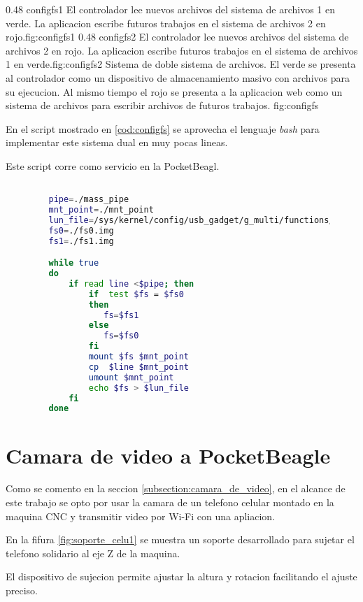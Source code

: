 \subfigab 
   {0.48} {configfs1} {El controlador lee nuevos archivos del sistema de archivos 1 en verde. La aplicacion escribe futuros trabajos en el sistema de archivos 2 en rojo.}{fig:configfs1}
   {0.48} {configfs2} {El controlador lee nuevos archivos del sistema de archivos 2 en rojo. La aplicacion escribe futuros trabajos en el sistema de archivos 1 en verde.}{fig:configfs2}
   {Sistema de doble sistema de archivos. El verde se presenta al controlador como un dispositivo de almacenamiento masivo con archivos para su ejecucion. Al mismo tiempo el rojo se presenta a la aplicacion web como un sistema de archivos para escribir archivos de futuros trabajos.}
   {fig:configfs}

   En el script mostrado en \ref{cod:configfs} se aprovecha el lenguaje \textit{bash} para implementar este sistema dual en muy pocas lineas.\par
   Este script corre como servicio en la PocketBeagl.

\begin{figure}[h]
   \begin{lstlisting}[language=bash,caption={Implementacion de doble sistema de archivos conectado con la tecnologia configFS. Se aprovecha la potencia del lenguaje de scripting y se corre como servicio.},label={cod:configfs}]

   pipe=./mass_pipe
   mnt_point=./mnt_point
   lun_file=/sys/kernel/config/usb_gadget/g_multi/functions/mass_storage.usb0/lun.0/file
   fs0=./fs0.img
   fs1=./fs1.img

   while true
   do
       if read line <$pipe; then
           if  test $fs = $fs0
           then
              fs=$fs1
           else
              fs=$fs0
           fi
           mount $fs $mnt_point
           cp  $line $mnt_point
           umount $mnt_point
           echo $fs > $lun_file
       fi
   done
   \end{lstlisting}
\end{figure}


\section{Camara de video a PocketBeagle}
Como se comento en la seccion \ref{subsection:camara_de_video}, en el alcance de este trabajo se opto por usar la camara de un telefono celular montado en la maquina CNC y transmitir video por Wi-Fi con una apliacion.\par
   En la fifura \ref{fig:soporte_celu1} se muestra un soporte desarrollado para sujetar el telefono solidario al eje Z de la maquina.\par
   El dispositivo de sujecion permite ajustar la altura y rotacion facilitando el ajuste preciso.\par

